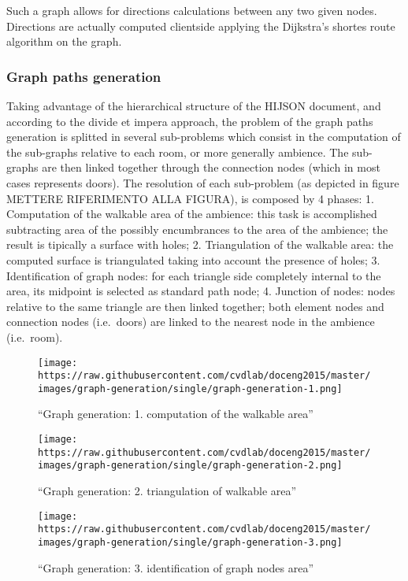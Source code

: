 \documentclass[]{article}
\begin{document}
Such a graph allows for directions calculations between any two given
nodes. Directions are actually computed clientside applying the
Dijkstra's shortes route algorithm on the graph.

\subsubsection{Graph paths generation}\label{graph-paths-generation}

Taking advantage of the hierarchical structure of the HIJSON document,
and according to the divide et impera approach, the problem of the graph
paths generation is splitted in several sub-problems which consist in
the computation of the sub-graphs relative to each room, or more
generally ambience. The sub-graphs are then linked together through the
connection nodes (which in most cases represents doors). The resolution
of each sub-problem (as depicted in figure METTERE RIFERIMENTO ALLA
FIGURA), is composed by 4 phases: 1. Computation of the walkable area of
the ambience: this task is accomplished subtracting area of the possibly
encumbrances to the area of the ambience; the result is tipically a
surface with holes; 2. Triangulation of the walkable area: the computed
surface is triangulated taking into account the presence of holes; 3.
Identification of graph nodes: for each triangle side completely
internal to the area, its midpoint is selected as standard path node; 4.
Junction of nodes: nodes relative to the same triangle are then linked
together; both element nodes and connection nodes (i.e.~doors) are
linked to the nearest node in the ambience (i.e.~room).

\begin{figure}[htbp]
\centering
\texttt{[image: https://raw.githubusercontent.com/cvdlab/doceng2015/master/images/graph-generation/single/graph-generation-1.png]}
\caption{``Graph generation: 1. computation of the walkable area''}
\end{figure}

\begin{figure}[htbp]
\centering
\texttt{[image: https://raw.githubusercontent.com/cvdlab/doceng2015/master/images/graph-generation/single/graph-generation-2.png]}
\caption{``Graph generation: 2. triangulation of walkable area''}
\end{figure}

\begin{figure}[htbp]
\centering
\texttt{[image: https://raw.githubusercontent.com/cvdlab/doceng2015/master/images/graph-generation/single/graph-generation-3.png]}
\caption{``Graph generation: 3. identification of graph nodes area''}
\end{figure}
\end{document}

